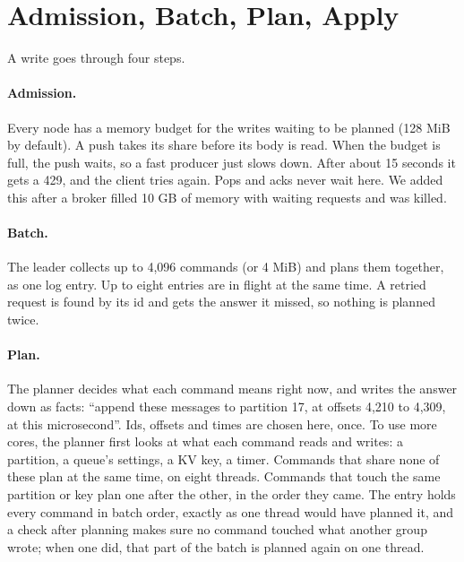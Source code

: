 
\section{Admission, Batch, Plan, Apply}

A write goes through four steps.


\paragraph{Admission.} Every node has a memory budget for the writes waiting to be planned (128 MiB
by default). A push takes its share before its body is read. When the budget is full, the push
waits, so a fast producer just slows down. After about 15 seconds it gets a 429, and the client
tries again. Pops and acks never wait here. We added this after a broker filled 10 GB of memory
with waiting requests and was killed.

\paragraph{Batch.} The leader collects up to 4,096 commands (or 4 MiB) and plans them together, as
one log entry. Up to eight entries are in flight at the same time. A retried request is found by
its id and gets the answer it missed, so nothing is planned twice.

\paragraph{Plan.} The planner decides what each command means right now, and writes the answer
down as facts: ``append these messages to partition 17, at offsets 4,210 to 4,309, at this
microsecond''. Ids, offsets and times are chosen here, once. To use more cores, the planner first
looks at what each command reads and writes: a partition, a queue's settings, a KV key, a timer.
Commands that share none of these plan at the same time, on eight threads. Commands that touch the
same partition or key plan one after the other, in the order they came. The entry holds every
command in batch order, exactly as one thread would have planned it, and a check after planning
makes sure no command touched what another group wrote; when one did, that part of the batch is
planned again on one thread.

